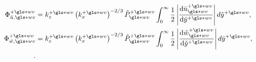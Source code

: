 \begin{align}
	\Phi _{\tilde{u},\gls*{wv}}\pw&=k_z\pw \left(k_x\pw\right)^{-2 /3} \hat{P}\ww\pw \int_{0}^{\infty} \frac{1}{2} \left| \dv{\check{u}\ww\pw}{\check{y}\pw}  \right| d\check{y}\pw,\\
	\Phi _{\tilde{w},\gls*{wv}}\pw&=k_z\pw \left(k_x\pw\right)^{-2 /3} \hat{P}\ww\pw \int_{0}^{\infty} \frac{1}{2} \left| \dv{\check{w}\ww\pw}{\check{y}\pw}  \right| d\check{y}\pw,\\
.\end{align}

